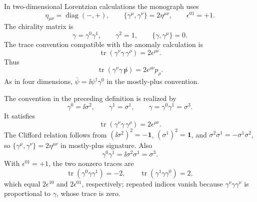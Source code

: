 \begin{definition}
\label{def:two-dimensional-mostly-plus-spinor-trace-convention}
In two-dimensional Lorentzian calculations the monograph uses
\[
  \eta_{\mu\nu}=\operatorname{diag}(-,+),
  \qquad
  \{\gamma^\mu,\gamma^\nu\}=2\eta^{\mu\nu},
  \qquad
  \epsilon^{01}=+1 .
\]
The chirality matrix is
\[
  \gamma=\gamma^0\gamma^1,
  \qquad
  \gamma^2=1,
  \qquad
  \{\gamma,\gamma^\mu\}=0 .
\]
The trace convention compatible with the anomaly calculation is
\[
  \operatorname{tr}(\gamma^\nu\gamma\,\gamma^\rho)
  =
  2\epsilon^{\rho\nu}.
\]
Thus
\[
  \operatorname{tr}(\gamma^\nu\gamma\,\not p)
  =
  2\epsilon^{\rho\nu}p_\rho .
 \]
As in four dimensions, \(\bar\psi=\ii\psi^\dagger\gamma^0\) in the
mostly-plus convention.
\end{definition}

\begin{remark}
\label{rem:two-dimensional-chirality-trace}
The convention in the preceding definition is realized by
\[
  \gamma^0=\ii\sigma^2,\qquad
  \gamma^1=\sigma^1,\qquad
  \gamma=\gamma^0\gamma^1=\sigma^3.
\]
It satisfies
\[
  \operatorname{tr}(\gamma^\nu\gamma\,\gamma^\rho)
  =
  2\epsilon^{\rho\nu}.
\]
The Clifford relation follows from
\((\ii\sigma^2)^2=-\mathbf1\), \((\sigma^1)^2=\mathbf1\), and
\(\sigma^2\sigma^1=-\sigma^1\sigma^2\), so
\(\{\gamma^\mu,\gamma^\nu\}=2\eta^{\mu\nu}\) in mostly-plus signature.  Also
\[
  \gamma^0\gamma^1=\ii\sigma^2\sigma^1=\sigma^3 .
\]
With \(\epsilon^{01}=+1\), the two nonzero traces are
\[
  \operatorname{tr}(\gamma^0\gamma\gamma^1)=-2,
  \qquad
  \operatorname{tr}(\gamma^1\gamma\gamma^0)=2,
\]
which equal \(2\epsilon^{10}\) and \(2\epsilon^{01}\), respectively; repeated
indices vanish because \(\gamma^\nu\gamma\gamma^\nu\) is proportional to
\(\gamma\), whose trace is zero.
\end{remark}

